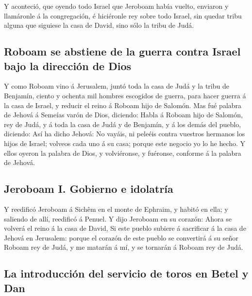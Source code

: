  Y aconteció, que oyendo todo Israel que Jeroboam había
vuelto, enviaron y llamáronle á la congregación, é hiciéronle rey sobre
todo Israel, sin quedar tribu alguna que siguiese la casa de David, sino
sólo la tribu de Judá.

\hypertarget{roboam-se-abstiene-de-la-guerra-contra-israel-bajo-la-direcciuxf3n-de-dios}{%
\subsection{Roboam se abstiene de la guerra contra Israel bajo la
dirección de
Dios}\label{roboam-se-abstiene-de-la-guerra-contra-israel-bajo-la-direcciuxf3n-de-dios}}

 Y como Roboam vino á Jerusalem, juntó toda la casa de
Judá y la tribu de Benjamín, ciento y ochenta mil hombres escogidos de
guerra, para hacer guerra á la casa de Israel, y reducir el reino á
Roboam hijo de Salomón.  Mas fué palabra de Jehová á
Semeías varón de Dios, diciendo:  Habla á Roboam hijo de
Salomón, rey de Judá, y á toda la casa de Judá y de Benjamín, y á los
demás del pueblo, diciendo:  Así ha dicho Jehová: No
vayáis, ni peleéis contra vuestros hermanos los hijos de Israel; volveos
cada uno á su casa; porque este negocio yo lo he hecho. Y ellos oyeron
la palabra de Dios, y volviéronse, y fuéronse, conforme á la palabra de
Jehová.

\hypertarget{jeroboam-i.-gobierno-e-idolatruxeda}{%
\subsection{Jeroboam I. Gobierno e
idolatría}\label{jeroboam-i.-gobierno-e-idolatruxeda}}

 Y reedificó Jeroboam á Sichêm en el monte de Ephraim, y
habitó en ella; y saliendo de allí, reedificó á Penuel. 
Y dijo Jeroboam en su corazón: Ahora se volverá el reino á la casa de
David,  Si este pueblo subiere á sacrificar á la casa de
Jehová en Jerusalem: porque el corazón de este pueblo se convertirá á su
señor Roboam rey de Judá, y me matarán á mí, y se tornarán á Roboam rey
de Judá.

\hypertarget{la-introducciuxf3n-del-servicio-de-toros-en-betel-y-dan}{%
\subsection{La introducción del servicio de toros en Betel y
Dan}\label{la-introducciuxf3n-del-servicio-de-toros-en-betel-y-dan}}

